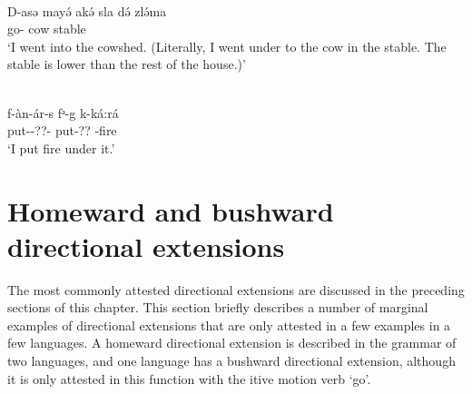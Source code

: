 \ea\label{ex:park8}
 \\
\gll D-asə mayə́ akə́ sla də́ zlə́ma \\
go-   cow  stable	\\
\glt `I went into the cowshed. (Literally, I went under to the cow in the stable. The stable is lower than the rest of the house.)'

\ex\label{ex:glav8}
 \\
\gll f-àn-ár-s	fᵊ-g	k-ká:rá \\
put--??-	put-??	-fire \\
\glt `I put fire under it.'
\z

\section{Homeward and bushward directional extensions} \label{sec:otherDIR1} \label{sec:home} \label{sec:bush}

The most commonly attested directional extensions are discussed in the preceding sections of this chapter. This section briefly describes a number of marginal examples of directional extensions that are only attested in a few examples in a few languages. A homeward directional extension is described in the grammar of two languages, and one language has a bushward directional extension, although it is only attested in this function with the itive motion verb `go'. 

